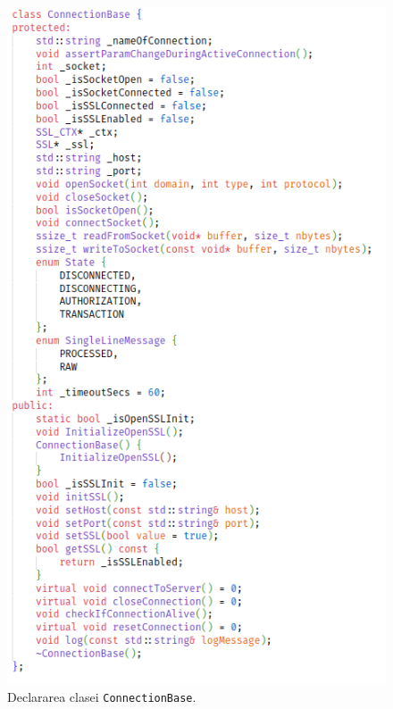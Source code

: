 \documentclass[runningheads]{llncs}
\begin{document}
\begin{figure}
    \centering
    \includegraphics[width=\textwidth]{connectionBase.png}
    \caption{Declararea clasei \texttt{ConnectionBase}.}
    \label{fig:connectionBase}
\end{figure}
\end{document}
